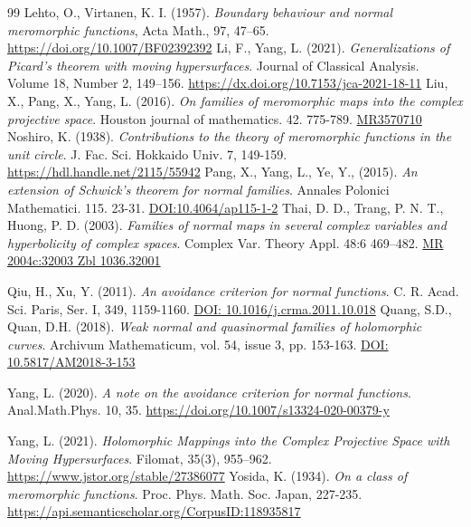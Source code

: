 \documentclass[11pt, reqno]{amsart}
\theoremstyle{definition}
\theoremstyle{remark}
\numberwithin{equation}{section}
\begin{document}
\begin{thebibliography}{99}
 \label{leh-bbanmf-1957} Lehto, O., Virtanen, K. I. (1957). \textit{Boundary behaviour and normal meromorphic functions}, Acta Math., 97, 47–65. \url{https://doi.org/10.1007/BF02392392}
 \label{li-goptwmh-2021} Li, F., Yang, L. (2021). \textit{Generalizations of Picard's theorem with moving hypersurfaces}. Journal of Classical Analysis. Volume 18, Number 2, 149–156. \url{https://dx.doi.org/10.7153/jca-2021-18-11}
 \label{liu-ofommitcps-2016} Liu, X., Pang, X., Yang, L. (2016). \textit{On families of meromorphic maps into the complex projective space}. Houston journal of mathematics. 42. 775-789. \url{MR3570710}
 \label{nos-ctttomfituc-1938}  Noshiro, K. (1938). \textit{Contributions to the theory of meromorphic functions in the unit circle}. J. Fac. Sci. Hokkaido
Univ. 7, 149-159. \url{https://hdl.handle.net/2115/55942}
 \label{pang-axostfnf-2015} Pang, X., Yang, L., Ye, Y., (2015). \textit{An extension of Schwick's theorem for normal families}. Annales Polonici Mathematici. 115. 23-31. \url{DOI:10.4064/ap115-1-2} 
 \label{thai-fonmiscvahocs-2003} Thai, D. D., Trang, P. N. T., Huong, P. D. (2003). \textit{Families of normal maps in several
complex variables and hyperbolicity of complex spaces}. Complex Var. Theory Appl. 48:6
469–482. \url{MR 2004c:32003 Zbl 1036.32001}

 \label{qiu-aacfnf-2011}  Qiu, H., Xu, Y. (2011). \textit{An avoidance criterion for normal functions}. C. R. Acad. Sci. Paris, Ser. I, 349, 1159-1160. \url{DOI: 10.1016/j.crma.2011.10.018}
 \label{quang-wnaqfohc-2018} Quang, S.D., Quan, D.H. (2018). \textit{Weak normal and quasinormal families of holomorphic curves}. Archivum Mathematicum, vol. 54, issue 3, pp. 153-163. \url{DOI: 10.5817/AM2018-3-153}

 \label{yang-anotacfnf-2020} Yang, L. (2020). \textit{A note on the avoidance criterion for normal functions}. Anal.Math.Phys. 10, 35. \url{https://doi.org/10.1007/s13324-020-00379-y}

 \label{yang-hmitcpswmh-2021} Yang, L. (2021). \textit{Holomorphic Mappings into the Complex Projective Space with Moving Hypersurfaces}. Filomat, 35(3), 955–962. \url{https://www.jstor.org/stable/27386077}
 \label{yos-oacomf-1934} Yosida, K. (1934). \textit{On a class of meromorphic functions}. Proc. Phys. Math. Soc. Japan, 227-235. \url{https://api.semanticscholar.org/CorpusID:118935817}
\end{thebibliography}
\end{document}
